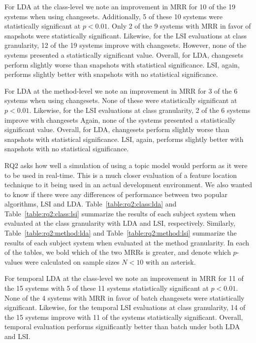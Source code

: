 For LDA at the class-level we note an improvement in MRR for 10 of the 19 systems when using changesets.
Additionally, 5 of these 10 systems were statistically significant at $p<0.01$.
Only 2 of the 9 systems with MRR in favor of snapshots were statistically significant.
Likewise, for the LSI evaluations at class granularity, 12 of the 19 systems improve with changesets.
However, none of the systems presented a statistically significant value.
Overall, for LDA, changesets perform slightly worse than snapshots with statistical significance.
LSI, again, performs slightly better with snapshots with no statistical significance.

For LDA at the method-level we note an improvement in MRR for 3 of the 6 systems when using changesets.
None of these were statistically significant at $p<0.01$.
Likewise, for the LSI evaluations at class granularity, 2 of the 6 systems improve with changesets
Again, none of the systems presented a statistically significant value.
Overall, for LDA, changesets perform slightly worse than snapshots with statistical significance.
LSI, again, performs slightly better with snapshots with no statistical significance.








RQ2 asks how well a simulation of using a topic model would perform as
it were to be used in real-time.
This is a much closer evaluation of a feature location technique to it
being used in an actual development environment.
We also wanted to know if there were any differences of performance
between two popular algorithms, LSI and LDA.
Table~\ref{table:rq2:class:lda} and Table~\ref{table:rq2:class:lsi}
summarize the results of each subject system when
evaluated at the class granularity with LDA and LSI, respectively.
Similarly, Table~\ref{table:rq2:method:lda} and Table~\ref{table:rq2:method:lsi}
summarize the results of each subject system when
evaluated at the method granularity.
In each of the tables, we bold which of the two MRRs is greater,
and denote which $p$-values were calculated on sample sizes $N<10$ with an asterisk.

For temporal LDA at the class-level we note an improvement in MRR for 11 of the 15 systems
with 5 of these 11 systems statistically significant at $p<0.01$.
None of the 4 systems with MRR in favor of batch changesets were statistically significant.
Likewise, for the temporal LSI evaluations at class granularity, 14 of the 15 systems improve
with 11 of the systems statistically significant.
Overall, temporal evaluation performs significantly better than batch under both LDA and LSI.


